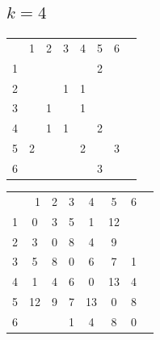\documentclass[10pt,a4paper,spanish]{report}
\theoremstyle{definition}
\theoremstyle{remark}
\begin{document}
\subsection{$k=4$}
\begin{minipage}{0.5\textwidth}
\begin{center}
\begin{tabular}{c|c|c|c|c|c|c|c|}
\multicolumn{2}{r}{1} & \multicolumn{1}{c}{2} & \multicolumn{1}{c}{3} & \multicolumn{1}{c}{4} & \multicolumn{1}{c}{5} & \multicolumn{1}{c}{6} \\ 
\cline{2-7}
1 & & & & & 2 & \cellcolor{Black}{\textcolor{White}{4}} \\
\cline{2-7} 
2 & & & 1 & 1 & & \cellcolor{Black}{\textcolor{White}{4}} \\
\cline{2-7} 
3 & & 1 & & 1 & & \\
\cline{2-7} 
4 & & 1 & 1 & & 2 & \\
\cline{2-7} 
5 & 2 & & & 2 & & 3 \\
\cline{2-7} 
6 & \cellcolor{Black}{\textcolor{White}{4}} & \cellcolor{Black}{\textcolor{White}{4}} & & & 3 & \\
\cline{2-7} 
\end{tabular}
\end{center}
\end{minipage}
\begin{minipage}{0.5\textwidth}
\begin{center}
\begin{tabular}{c|c|c|c|c|c|c|c|}
\multicolumn{2}{r}{1} & \multicolumn{1}{c}{2} & \multicolumn{1}{c}{3} & \multicolumn{1}{c}{4} & \multicolumn{1}{c}{5} & \multicolumn{1}{c}{6} \\ 
\cline{2-7}
1 & 0 & 3 & 5 & 1 & 12 & \cellcolor{Black}{\textcolor{White}{5}} \\
\cline{2-7} 
2 & 3 & 0 & 8 & 4 & 9 & \cellcolor{Black}{\textcolor{White}{8}} \\
\cline{2-7} 
3 & 5 & 8 & 0 & 6 & 7 & 1 \\
\cline{2-7} 
4 & 1 & 4 & 6 & 0 & 13 & 4 \\
\cline{2-7} 
5 & 12 & 9 & 7 & 13 & 0 &  8 \\
\cline{2-7} 
6 & \cellcolor{Black}{\textcolor{White}{5}} & \cellcolor{Black}{\textcolor{White}{8}} & 1 & 4 & 8 & 0 \\
\cline{2-7} 
\end{tabular}
\end{center}
\end{minipage}
\end{document}
